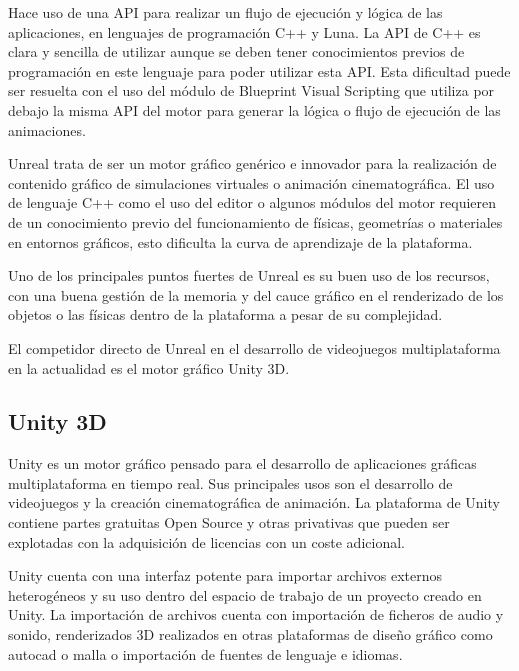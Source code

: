 \documentclass[a4paper, 17pt]{book}
\begin{document}
Hace uso de una API para realizar un flujo de ejecución y lógica de las aplicaciones, en lenguajes de
programación C++ y Luna. La API de C++ es clara y sencilla de utilizar aunque se deben tener conocimientos
previos de programación en este lenguaje para poder utilizar esta API. Esta dificultad puede ser resuelta
con el uso del módulo de  Blueprint Visual Scripting que utiliza por debajo la misma API del motor para
generar la lógica o flujo de ejecución de las animaciones.

\vspace{1mm} %

Unreal trata de ser un motor gráfico genérico e innovador para la realización de contenido gráfico de
simulaciones virtuales o animación cinematográfica. El uso de lenguaje C++ como el uso del editor o
algunos módulos del motor requieren de un conocimiento previo del funcionamiento de físicas, geometrías
o materiales en entornos gráficos, esto dificulta la curva de aprendizaje de la plataforma.

\vspace{1mm} %

Uno de los principales puntos fuertes de Unreal es su buen uso de los recursos, con una buena gestión
de la memoria y del cauce gráfico en el renderizado de los objetos o las físicas dentro de la plataforma
a pesar de su complejidad. 

\vspace{1mm} %

El competidor directo de Unreal en el desarrollo de videojuegos multiplataforma en la actualidad es el
motor gráfico Unity 3D.

\subsection{Unity 3D} 
\label{subsec:Unity3D}

Unity es un motor gráfico pensado para el desarrollo de aplicaciones gráficas multiplataforma en tiempo
real. Sus principales usos son el desarrollo de videojuegos y la creación cinematográfica de animación.
La plataforma de Unity contiene partes gratuitas Open Source y otras privativas que pueden ser explotadas
con la adquisición de licencias con un coste adicional.

\vspace{1mm} %

Unity cuenta con una interfaz potente para importar archivos externos heterogéneos y su uso dentro del
espacio de trabajo de un proyecto creado en Unity.  La importación de archivos cuenta con importación
de ficheros de audio y sonido, renderizados 3D realizados en otras plataformas de diseño gráfico como
autocad o malla o importación de fuentes de lenguaje e idiomas.
\end{document}
